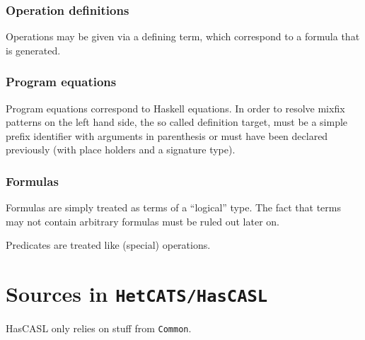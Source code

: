 \documentclass{article}
\begin{document}
\subsubsection{Operation definitions}

Operations may be given via a defining term, which correspond to a formula
that is generated. 

\subsubsection{Program equations}

Program equations correspond to Haskell equations. In order to resolve mixfix
patterns on the left hand side, the so called definition target, must be a
simple prefix identifier with arguments in parenthesis or must have been
declared previously (with place holders and a signature type).


\subsubsection{Formulas}

Formulas are simply treated as terms of a ``logical'' type. The fact that
terms may not contain arbitrary formulas must be ruled out later on.

Predicates are treated like (special) operations. 

\section{Sources in \texttt{HetCATS/HasCASL}}

HasCASL only relies on stuff from \texttt{Common}.
\end{document}
